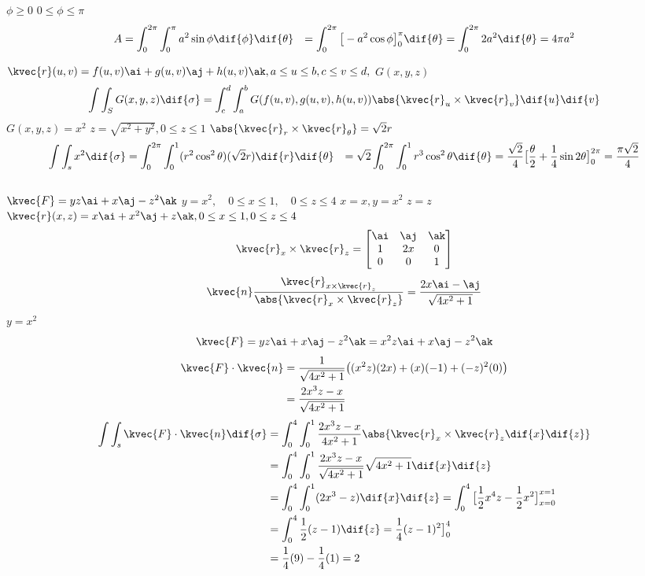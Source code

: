 \(   \phi\ge 0           \)  
\(   0\le\phi\le\pi          \)  
\begin{align*}
A&=\int_{0}^{2\pi}\int_{0}^{\pi} a^{2}\sin\phi\dif{\phi}\dif{\theta}
&=\int_{0}^{2\pi}\big[ -a^{2}\cos\phi    \big]_{0}^{\pi}\dif{\theta}=\int_{0}^{2\pi} 2a^{2}\dif{\theta}=4\pi a^{2}
\end{align*}

\(\kvec{r}(u,v)=f(u,v)\ai+g(u,v)\aj+h(u,v)\ak,  a\le u\le b, c\le v\le d,\)
\(  G(x,y,z)           \)    
 \[  \int\int_{S}G(x,y,z)\dif{\sigma}=\int_{c}^{d}\int_{a}^{b} G(f(u,v),g(u,v),h(u,v))\abs{\kvec{r}_{u}\times\kvec{r}_{v}}\dif{u}\dif{v}            \]
\(    G(x,y,z)=x^{2}         \) 
\(  z=\sqrt{x^{2}+y^{2}}, 0\le z\le 1           \) 
\(   \abs{\kvec{r}_{r}\times \kvec{r}_{\theta}}=\sqrt{2}r          \) 
\begin{align*}
\int\int_{s}x^{2}\dif{\sigma}&=\int_{0}^{2\pi}\int_{0}^{1}(r^{2}\cos^{2}\theta)(\sqrt{2}r)\dif{r}\dif{\theta}
&=\sqrt{2}\int_{0}^{2\pi}\int_{0}^{1}r^{3}\cos^{2}\theta\dif{\theta}=\frac{\sqrt{2}}{4}\big[ \frac{\theta}{2}+\frac{1}{4}\sin2\theta   \big]_{0}^{2\pi}=\frac{\pi \sqrt{2}}{4}
\end{align*}
\(             \)             \[              \]
\(  \kvec{F}=yz\ai+x\aj-z^{2}\ak           \) 
\(     y=x^{2},\quad 0\le x\le1,\quad 0\le z\le 4        \) 
\(     x=x , y=x^{2}         \) 
\(    z=z         \) 
\(  \kvec{r}(x,z)=x\ai+x^{2}\aj+z\ak, 0\le x\le 1, 0\le z\le 4           \) 
\begin{equation}
\kvec{r}_{x}\times \kvec{r}_{z}=
\begin{bmatrix}
\ai   &    \aj   &    \ak   \\
1  &   2x   &   0  \\
0&    0&   1\\
\end{bmatrix}
\end{equation}
 \[      \kvec{n}\frac{\kvec{r}_{x\times\kvec{r}_{z}}}{\abs{\kvec{r}_{x}\times\kvec{r}_{z}}}=\frac{2x\ai-\aj}{\sqrt{4x^{2}+1}}        \]
\(   y=x^{2}  \)
 \[ \kvec{F}=yz\ai+x\aj-z^{2}\ak=x^{2}z\ai+x\aj-z^{2}\ak             \]
\begin{align*}
\kvec{F}\cdot\kvec{n}&=\frac{1}{\sqrt{4x^{2}+1}}\big(  (x^{2}z)(2x)+(x)(-1)+(-z)^{2}(0)  \big)\\
&=\frac{2x^{3}z-x}{\sqrt{4x^{2}+1}}
\end{align*}
\begin{align*}
\int\int_{s}\kvec{F}\cdot\kvec{n}\dif{\sigma}&=\int_{0}^{4}\int_{0}^{1}\frac{2x^{3}z-x}{4x^{2}+1}\abs{\kvec{r}_{x}\times\kvec{r}_{z}\dif{x}\dif{z}}\\
&=\int_{0}^{4}\int_{0}^{1}\frac{2x^{3}z-x}{\sqrt{4x^{2}+1}}\sqrt{4x^{2}+1}\dif{x}\dif{z}\\
&=\int_{0}^{4}\int_{0}^{1}(2x^{3}-z)\dif{x}\dif{z}=\int_{0}^{4}\big[ \frac{1}{2}x^{4}z-\frac{1}{2}x^{2}     \big]_{x=0}^{x=1}\\
&=\int_{0}^{4}\frac{1}{2}(z-1)\dif{z}=\frac{1}{4}(z-1)^{2}\big]_{0}^{4}\\
&=\frac{1}{4}(9)-\frac{1}{4}(1)=2
\end{align*}
